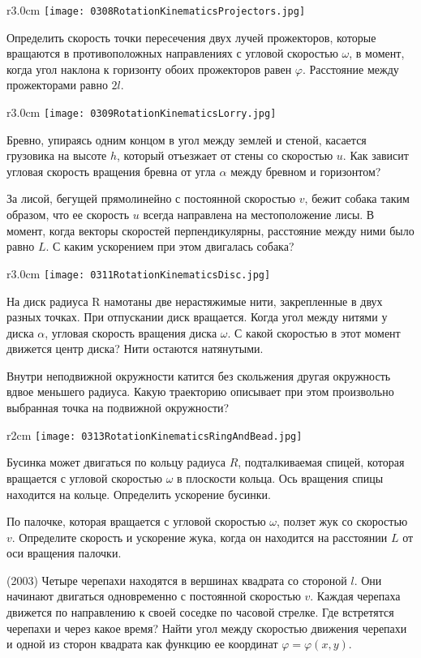 \begin{wrapfigure}{r}{3.0cm}
\texttt{[image: 0308RotationKinematicsProjectors.jpg]}
\end{wrapfigure}

\AddProb Определить скорость точки пересечения двух лучей прожекторов, 
которые вращаются в противоположных направлениях с угловой скоростью $\omega$, в момент, 
когда угол наклона к горизонту обоих прожекторов равен $\varphi$. Расстояние между прожекторами равно $2l$.

\begin{wrapfigure}{r}{3.0cm}
\texttt{[image: 0309RotationKinematicsLorry.jpg]}
\end{wrapfigure}

\AddProb Бревно, упираясь одним концом в угол между землей и стеной, касается грузовика на высоте $h$, 
который отъезжает от стены со скоростью $u$. Как зависит угловая скорость вращения бревна от угла $\alpha$ между бревном и горизонтом?

\AddProb За лисой, бегущей прямолинейно с постоянной скоростью $v$, бежит собака таким образом, 
что ее скорость $u$ всегда направлена на местоположение лисы. В момент, когда векторы скоростей перпендикулярны, 
расстояние между ними было равно $L$. С каким ускорением при этом двигалась собака?

\begin{wrapfigure}{r}{3.0cm}
\texttt{[image: 0311RotationKinematicsDisc.jpg]}
\end{wrapfigure}

\AddProb На диск радиуса R намотаны две нерастяжимые нити, закрепленные в двух разных точках. 
При отпускании диск вращается. Когда угол между нитями у диска $\alpha$, угловая скорость вращения диска $\omega$. 
С какой скоростью в этот момент движется центр диска? Нити остаются натянутыми.

\AddProb Внутри неподвижной окружности катится без скольжения другая окружность вдвое меньшего радиуса. 
Какую траекторию описывает при этом произвольно выбранная точка на подвижной окружности?

\begin{wrapfigure}{r}{2cm}
\texttt{[image: 0313RotationKinematicsRingAndBead.jpg]}
\end{wrapfigure}

\AddProb Бусинка может двигаться по кольцу радиуса $R$, подталкиваемая спицей, 
которая вращается с угловой скоростью $\omega$ в плоскости кольца. Ось вращения спицы находится на кольце. Определить ускорение бусинки.

\AddProb По палочке, которая вращается с угловой скоростью $\omega$, ползет жук со скоростью $v$. 
Определите скорость и ускорение жука, когда он находится на расстоянии $L$ от оси вращения палочки.

\AddProb (2003) Четыре черепахи находятся в вершинах квадрата со стороной $l$. Они начинают двигаться одновременно с постоянной скоростью $v$. 
Каждая черепаха движется по направлению к своей соседке по часовой стрелке. Где встретятся черепахи и через какое время? 
Найти угол между скоростью движения черепахи и одной из сторон квадрата как функцию ее координат $\varphi = \varphi (x,y)$.

